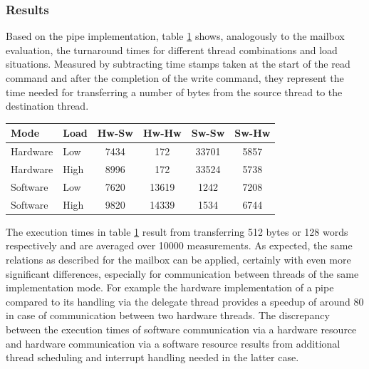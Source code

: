 \subsubsection{Results}
Based on the pipe implementation, table \ref{tab:pipe_turn} shows, analogously
to the mailbox evaluation, the turnaround times for different thread
combinations and load situations. Measured by subtracting time stamps taken at
the start of the read command and after the completion of the write command, they represent the time needed for transferring a number of bytes from the source thread to the destination thread.
\begin{table}
	\scriptsize
	\centering
	\label{tab:pipe_turn}
	\begin{tabular}{llcccc}
	\hline
	\textbf{Mode} & \textbf{Load} & \textbf{Hw-Sw} & \textbf{Hw-Hw} & \textbf{Sw-Sw} & \textbf{Sw-Hw}\\
	\hline
	Hardware & Low & 7434 & 172 & 33701 & 5857\\
	Hardware & High & 8996 & 172 & 33524 & 5738\\
	Software & Low & 7620 & 13619 & 1242 & 7208\\
	Software & High & 9820 & 14339 & 1534 & 6744\\
	\hline
	\end{tabular}
\end{table}
The execution times in table \ref{tab:pipe_turn} result from transferring 512
bytes or 128 words respectively and are averaged over 10000 measurements. As
expected, the same relations as described for the mailbox can be applied,
certainly with even more significant differences, especially for communication
between threads of the same implementation mode. For example the hardware
implementation of a pipe compared to its handling via the delegate thread
provides a speedup of around 80 in case of communication between two hardware
threads. The discrepancy between the execution times of software communication
via a hardware resource and hardware communication via a software resource
results from additional thread scheduling and interrupt handling needed in the
latter case.

